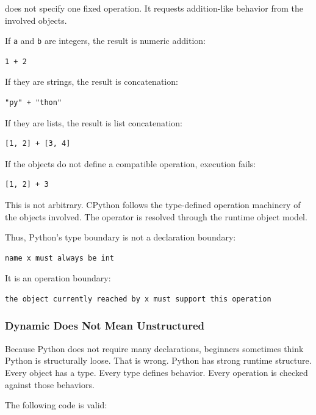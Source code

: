 does not specify one fixed operation. It requests addition-like behavior from the involved objects.

If \texttt{a} and \texttt{b} are integers, the result is numeric addition:

\begin{verbatim}
1 + 2
\end{verbatim}

If they are strings, the result is concatenation:

\begin{verbatim}
"py" + "thon"
\end{verbatim}

If they are lists, the result is list concatenation:

\begin{verbatim}
[1, 2] + [3, 4]
\end{verbatim}

If the objects do not define a compatible operation, execution fails:

\begin{verbatim}
[1, 2] + 3
\end{verbatim}

This is not arbitrary. CPython follows the type-defined operation machinery of the objects involved. The operator is resolved through the runtime object model.

Thus, Python's type boundary is not a declaration boundary:

\begin{verbatim}
name x must always be int
\end{verbatim}

It is an operation boundary:

\begin{verbatim}
the object currently reached by x must support this operation
\end{verbatim}

\subsubsection*{Dynamic Does Not Mean Unstructured}

Because Python does not require many declarations, beginners sometimes think Python is structurally loose. That is wrong. Python has strong runtime structure. Every object has a type. Every type defines behavior. Every operation is checked against those behaviors.

The following code is valid:


